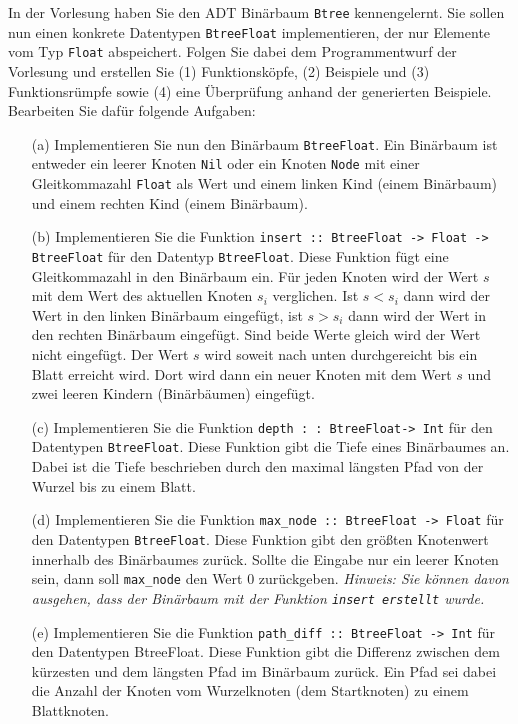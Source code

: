 In der Vorlesung haben Sie den ADT Binärbaum \texttt{Btree} kennengelernt. 
Sie sollen nun einen konkrete Datentypen \texttt{BtreeFloat} implementieren, 
der nur Elemente vom Typ \texttt{Float} abspeichert. Folgen Sie dabei dem 
Programmentwurf der Vorlesung und erstellen Sie (1) Funktionsköpfe, (2) Beispiele und 
(3) Funktionsrümpfe sowie (4) eine Überprüfung anhand der generierten Beispiele. 
Bearbeiten Sie dafür folgende Aufgaben:
\begin{itemize}
\item[(a)] Implementieren Sie nun den Binärbaum \texttt{BtreeFloat}. Ein Binärbaum ist 
entweder ein leerer Knoten \texttt{Nil} oder ein Knoten \texttt{Node} mit einer Gleitkommazahl 
\texttt{Float} als Wert und einem linken Kind (einem Binärbaum) und einem rechten Kind 
(einem Binärbaum).

\item[(b)] Implementieren Sie die Funktion \texttt{insert :: BtreeFloat -> Float -> BtreeFloat} 
für den Datentyp \texttt{BtreeFloat}. Diese Funktion fügt 
eine Gleitkommazahl in den Binärbaum ein. Für jeden Knoten wird der Wert $s$ mit
 dem Wert des aktuellen Knoten $s_{i}$ verglichen. Ist $s<s_{i}$ dann wird der Wert 
 in den linken Binärbaum eingefügt, ist $s>s_{i}$ dann wird der Wert in den rechten 
 Binärbaum eingefügt. Sind beide Werte gleich wird der Wert nicht eingefügt. 
 Der Wert $s$ wird soweit nach unten durchgereicht bis ein Blatt erreicht wird. 
 Dort wird dann ein neuer Knoten mit dem Wert $s$ und zwei leeren Kindern 
 (Binärbäumen) eingefügt.

\item[(c)] Implementieren Sie die Funktion \texttt{depth : : BtreeFloat-> Int} 
für den Datentypen \texttt{BtreeFloat}. Diese Funktion gibt die Tiefe eines Binärbaumes an. 
Dabei ist die Tiefe beschrieben durch den maximal längsten Pfad von der Wurzel bis 
zu einem Blatt.

\item[(d)] Implementieren Sie die Funktion \texttt{max_node :: BtreeFloat -> Float}
 für den Datentypen \texttt{BtreeFloat}. Diese Funktion gibt den größten Knotenwert 
innerhalb des Binärbaumes zurück. Sollte die Eingabe nur ein leerer Knoten sein, 
dann soll \texttt{max_node} den Wert 0 zurückgeben. \textit{Hinweis: Sie können davon ausgehen, 
dass der Binärbaum mit der Funktion \texttt{insert erstellt} wurde.}

\item[(e)] Implementieren Sie die Funktion \texttt{path_diff :: BtreeFloat -> Int}
für den Datentypen BtreeFloat. Diese Funktion gibt die Differenz zwischen dem 
kürzesten und dem längsten Pfad im Binärbaum zurück. Ein Pfad sei dabei die Anzahl 
der Knoten vom Wurzelknoten (dem Startknoten) zu einem Blattknoten.
\end{itemize}

